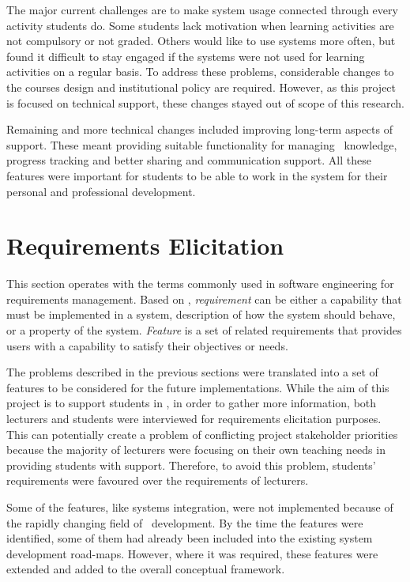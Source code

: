 The major current challenges are to make system usage
connected through every activity students do. Some students lack motivation
when learning activities are not compulsory or not graded. Others would like to
use systems more often, but found it difficult to stay engaged if the systems
were not used for learning activities on a regular basis. To address these
problems, considerable changes to the courses design and institutional policy
are required. However, as this project is focused on technical support, these
changes stayed out of scope of this research.

Remaining and more technical changes included improving long-term aspects of
\LLLs support. These meant providing suitable functionality for managing
\ep~knowledge, progress tracking and better sharing and communication support.
All these features were important for students to be able to work in the system
for their personal and professional development. 

\section{Requirements Elicitation}
\label{sec:elicit}
This section operates with the terms commonly used in software engineering for
requirements management. Based on \citet{Wiegers2003}, \textit{requirement} can
be either a capability that must be implemented in a system, description of how
the system should behave, or a property of the system. \textit{Feature} is a set
of related requirements that provides users with a capability to satisfy their
objectives or needs.

The problems described in the previous sections were translated into a set of
features to be considered for the future implementations. While the aim of this
project is to support students in \LLLsn, in order to gather more information,
both lecturers and students were interviewed for requirements elicitation
purposes. This can potentially create a problem of conflicting project
stakeholder priorities \citep{Leffingwell2011} because the majority of lecturers
were focusing on their own teaching needs in providing students with \LLLs
support. Therefore, to avoid this problem, students' requirements were favoured
over the requirements of lecturers. 

Some of the features, like systems integration, were not implemented because of
the rapidly changing field of \ep~development. By the time the features were
identified, some of them had already been included into the existing system
development road-maps. However, where it was required, these features were
extended and added to the overall conceptual framework.

